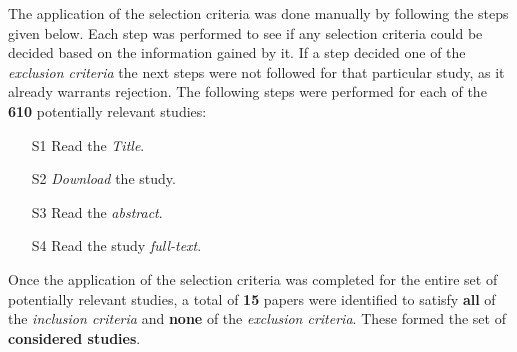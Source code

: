 The application of the selection criteria was done manually by following the steps given below. 
Each step was performed to see if any selection criteria could be decided based on the information gained by it. 
If a step decided one of the \textit{exclusion criteria} the next steps were not followed for that particular study, 
as it already warrants rejection. 
The following steps were performed for each of the \textbf{610} potentially relevant studies:
\begin{itemize}
	\item[S1] Read the \textit{Title}.
	\item[S2] \textit{Download} the study.
	\item[S3] Read the \textit{abstract}.
	\item[S4] Read the study \textit{full-text}.
\end{itemize}

Once the application of the selection criteria was completed for the entire set of potentially relevant studies,
a total of \textbf{15} papers were identified to satisfy \textbf{all} of the \textit{inclusion criteria} and
\textbf{none} of the \textit{exclusion criteria}. These formed the set of \textbf{considered studies}.

\vspace{2mm}

